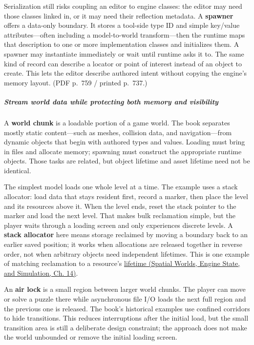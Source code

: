 Serialization still risks coupling an editor to engine classes: the editor may need those classes linked in, or it may need their reflection metadata. A \textbf{spawner} offers a data-only boundary. It stores a tool-side type ID and simple key/value attributes---often including a model-to-world transform---then the runtime maps that description to one or more implementation classes and initializes them. A spawner may instantiate immediately or wait until runtime asks it to. The same kind of record can describe a locator or point of interest instead of an object to create. This lets the editor describe authored intent without copying the engine's memory layout. (PDF p.~759 / printed p.~737.)

\subparagraph{Stream world data while protecting both memory and visibility}\label{06-engine-ii-ch032-stream-world-data-while-protecting-both-memory-and-visibility}

\hypertarget{06-engine-ii-ch032-stream-world-data-while-protecting-both-memory-and-visibility}{}

A \textbf{world chunk} is a loadable portion of a game world. The book separates mostly static content---such as meshes, collision data, and navigation---from dynamic objects that begin with authored types and values. Loading must bring in files and allocate memory; spawning must construct the appropriate runtime objects. Those tasks are related, but object lifetime and asset lifetime need not be identical.

The simplest model loads one whole level at a time. The example uses a stack allocator: load data that stays resident first, record a marker, then place the level and its resources above it. When the level ends, reset the stack pointer to the marker and load the next level. That makes bulk reclamation simple, but the player waits through a loading screen and only experiences discrete levels. A \textbf{stack allocator} here means storage reclaimed by moving a boundary back to an earlier saved position; it works when allocations are released together in reverse order, not when arbitrary objects need independent lifetimes. This is one example of matching reclamation to a resource's \href{../05-Spatial-Worlds-Engine-State-and-Simulation/main.pdf\#nameddest=05-engine-i-ch014-give-memory-a-lifetime-that-matches-the-work}{lifetime (Spatial Worlds, Engine State, and Simulation, Ch. 14)}.

An \textbf{air lock} is a small region between larger world chunks. The player can move or solve a puzzle there while asynchronous file I/O loads the next full region and the previous one is released. The book's historical examples use confined corridors to hide transitions. This reduces interruptions after the initial load, but the small transition area is still a deliberate design constraint; the approach does not make the world unbounded or remove the initial loading screen.

